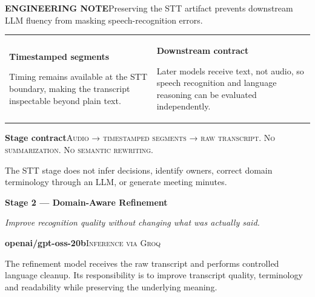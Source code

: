 \documentclass[9pt,a4paper]{extarticle}
\newcommand{\tagline}[1]{{\large\color{charcoal}\itshape #1\par}}
\begin{document}
\vspace{4pt}
\begin{notecard}\textbf{ENGINEERING NOTE}\quad Preserving the STT artifact prevents downstream LLM fluency from masking speech-recognition errors.
\end{notecard}

\vspace{4pt}
\begin{tabularx}{\textwidth}{@{}XX@{}}
\begin{card}\textbf{Timestamped segments}\par Timing remains available at the STT boundary, making the transcript inspectable beyond plain text.
\end{card}&
\begin{card}\textbf{Downstream contract}\par Later models receive text, not audio, so speech recognition and language reasoning can be evaluated independently.
\end{card}
\end{tabularx}

\vspace{4pt}
\begin{darkcard}
\textbf{Stage contract}\quad \textsc{Audio → timestamped segments → raw transcript. No summarization. No semantic rewriting.}\par
\small The STT stage does not infer decisions, identify owners, correct domain terminology through an LLM, or generate meeting minutes.
\end{darkcard}
\newpage

{\fontsize{22}{25}\selectfont\bfseries Stage 2 — Domain-Aware Refinement\par}
\tagline{Improve recognition quality without changing what was actually said.}
\vspace{4pt}

\begin{darkcard}
\textbf{openai/gpt-oss-20b}\hfill \textsc{Inference via Groq}\par
\vspace{2pt}
The refinement model receives the raw transcript and performs controlled language cleanup. Its responsibility is to improve transcript quality, terminology and readability while preserving the underlying meaning.
\end{darkcard}
\end{document}
